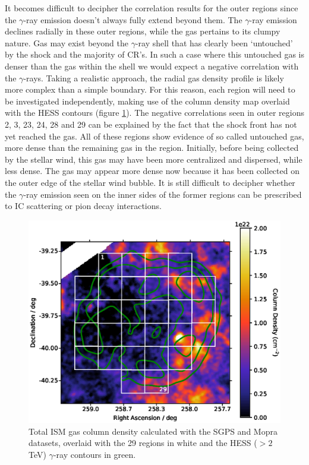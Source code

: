 \documentclass[12pt,a4paper]{article}
\begin{document}
It becomes difficult to decipher the correlation results for the outer regions since the $\gamma$-ray emission doesn't always fully extend beyond them.
The $\gamma$-ray emission declines radially in these outer regions, while the gas pertains to its clumpy nature.
Gas may exist beyond the $\gamma$-ray shell that has clearly been `untouched' by the shock and the majority of CR's. 
In such a case where this untouched gas is denser than the gas within the shell we would expect a negative correlation with the $\gamma$-rays.
Taking a realistic approach, the radial gas density profile is likely more complex than a simple boundary.
For this reason, each region will need to be investigated independently, making use of the column density map overlaid with the HESS contours (figure \ref{fig:mopHI hess contour}).
The negative correlations seen in outer regions 2, 3, 23, 24, 28 and 29 can be explained by the fact that the shock front has not yet reached the gas.
All of these regions show evidence of so called untouched gas, more dense than the remaining gas in the region.
Initially, before being collected by the stellar wind, this gas may have been more centralized and dispersed, while less dense.
The gas may appear more dense now because it has been collected on the outer edge of the stellar wind bubble.
It is still difficult to decipher whether the $\gamma$-ray emission seen on the inner sides of the former regions can be prescribed to IC scattering or pion decay interactions. 

\begin{figure}[H]
	\centering
	\includegraphics[width=0.60\linewidth, height=0.3\textheight]{NH_mopHI_hcont_reg}
	\caption{Total ISM gas column density calculated with the SGPS and Mopra datasets, overlaid with the 29 regions in white and the HESS ($>2$ TeV) $\gamma$-ray contours in green.}
	\label{fig:mopHI hess contour}
\end{figure}
\end{document}

